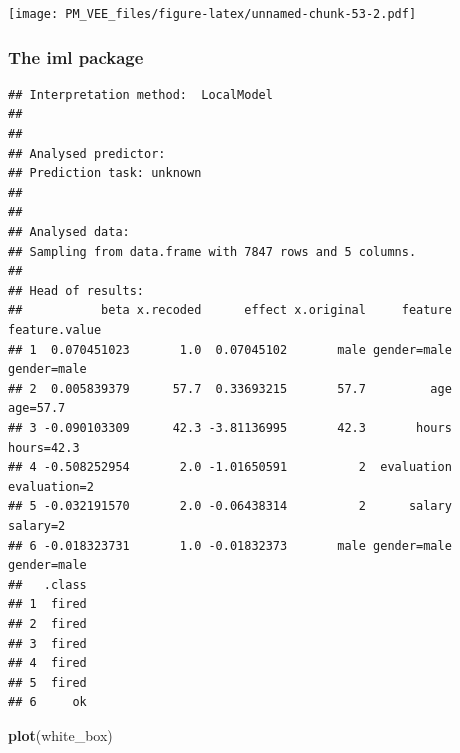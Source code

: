 \documentclass[]{krantz}
\newenvironment{Shaded}{\begin{snugshade}}{\end{snugshade}}
\newcommand{\DataTypeTok}[1]{\textcolor[rgb]{0.13,0.29,0.53}{#1}}
\newcommand{\DecValTok}[1]{\textcolor[rgb]{0.00,0.00,0.81}{#1}}
\newcommand{\KeywordTok}[1]{\textcolor[rgb]{0.13,0.29,0.53}{\textbf{#1}}}
\newcommand{\NormalTok}[1]{#1}
\newcommand{\OperatorTok}[1]{\textcolor[rgb]{0.81,0.36,0.00}{\textbf{#1}}}
\newcommand{\StringTok}[1]{\textcolor[rgb]{0.31,0.60,0.02}{#1}}
\theoremstyle{definition}
\theoremstyle{definition}
\theoremstyle{definition}
\theoremstyle{remark}
\begin{document}
\texttt{[image: PM\_VEE\_files/figure-latex/unnamed-chunk-53-2.pdf]}

\hypertarget{the-iml-package}{%
\subsubsection{\texorpdfstring{\textbf{The iml
package}}{The iml package}}\label{the-iml-package}}

\begin{Shaded}
\end{Shaded}

\begin{verbatim}
## Interpretation method:  LocalModel 
## 
## 
## Analysed predictor: 
## Prediction task: unknown 
## 
## 
## Analysed data:
## Sampling from data.frame with 7847 rows and 5 columns.
## 
## Head of results:
##           beta x.recoded      effect x.original     feature feature.value
## 1  0.070451023       1.0  0.07045102       male gender=male   gender=male
## 2  0.005839379      57.7  0.33693215       57.7         age      age=57.7
## 3 -0.090103309      42.3 -3.81136995       42.3       hours    hours=42.3
## 4 -0.508252954       2.0 -1.01650591          2  evaluation  evaluation=2
## 5 -0.032191570       2.0 -0.06438314          2      salary      salary=2
## 6 -0.018323731       1.0 -0.01832373       male gender=male   gender=male
##   .class
## 1  fired
## 2  fired
## 3  fired
## 4  fired
## 5  fired
## 6     ok
\end{verbatim}

\begin{Shaded}
\begin{Highlighting}[]
\KeywordTok{plot}\NormalTok{(white_box)}
\end{Highlighting}
\end{Shaded}
\end{document}
